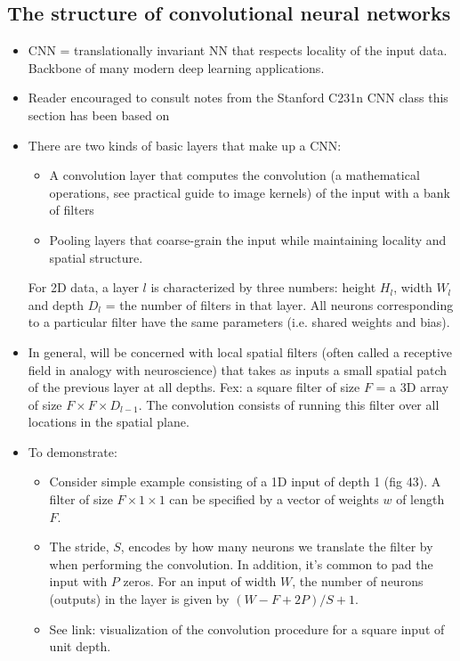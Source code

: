 \documentclass[norsk,a4paper,11pt]{article}
\begin{document}
\subsection{The structure of convolutional neural networks}
\begin{itemize}
	\item CNN = translationally invariant NN that respects locality of the input data. Backbone of many modern deep learning applications.
	\item Reader encouraged to consult notes from the Stanford C231n CNN class this section has been based on
	\item There are two kinds of basic layers that make up a CNN:
	\begin{itemize}
		\item A convolution layer that computes the convolution (a mathematical operations, see practical guide to image kernels) of the input with a bank of filters
		\item Pooling layers that coarse-grain the input while maintaining locality and spatial structure.
	\end{itemize}
	For 2D data, a layer $l$ is characterized by three numbers: height $H_l$, width $W_l$ and depth $D_l$ = the number of filters in that layer. All neurons corresponding to a particular filter have the same parameters (i.e. shared weights and bias).
	\item In general, will be concerned with local spatial filters (often called a receptive field in analogy with neuroscience) that takes as inputs a small spatial patch of the previous layer at all depths. Fex: a square filter of size $F$ = a 3D array of size $F\times F\times D_{l-1}$. The convolution consists of running this filter over all locations in the spatial plane.
	\item To demonstrate: 
	\begin{itemize}
		\item Consider simple example consisting of a 1D input of depth 1 (fig 43). A filter of size $F\times 1 \times 1$ can be specified by a vector of weights $w$ of length $F$. 
		\item The stride, $S$, encodes by how many neurons we translate the filter by when performing the convolution. In addition, it's common to pad the input with $P$ zeros. For an input of width $W$, the number of neurons (outputs) in the layer is given by $(W-F + 2P)/S + 1$. 
		\item See link: visualization of the convolution procedure for a square input of unit depth. 

\end{itemize}
\end{itemize}
\end{document}
